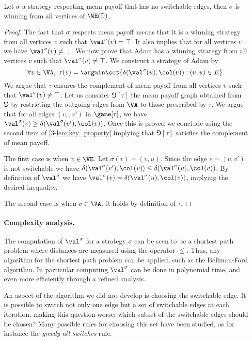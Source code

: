 \begin{lemma}[Optimality]
Let $\sigma$ a strategy respecting mean payoff that has no switchable edges, then 
$\sigma$ is winning from all vertices of $\WE(\Game)$.
\end{lemma}

\begin{proof}
The fact that $\sigma$ respects mean payoff means that it is a winning strategy
from all vertices $v$ such that $\val^\sigma(v) = \top$.
It also implies that for all vertices $v$ we have $\val^{\sigma}(v) \neq \bot$.
We now prove that Adam has a winning strategy from all vertices $v$ such that $\val^{\sigma}(v) \neq \top$.
We construct a strategy of Adam by
\[
\forall v \in \VA,\ \tau(v) = \argmin \set{ \delta(\val^{\sigma}(u),\col(v)) : (v,u) \in E }.
\]
We argue that $\tau$ ensures the complement of mean payoff from all vertices $v$ such that $\val^{\sigma}(v) \neq \top$.
Let us consider $\Game[\tau]$ the mean payoff graph obtained from $\Game$ by restricting the outgoing edges from $\VA$
to those prescribed by $\tau$.
We argue that for all edges $(v,,v')$ in $\game[\tau]$, we have 
$\val^{\sigma}(v) \ge \delta(\val^{\sigma}(v'),\col(v))$.
Once this is proved we conclude using the second item of \cref{3-lem:key_property} implying that $\Game[\tau]$ satisfies the complement of mean payoff.

The first case is when $v \in \VE$. 
Let $\sigma(v) = (v,u)$.
Since the edge $e = (v,v')$ is not switchable we have 
$\delta(\val^{\sigma}(v'),\col(v)) \le \delta(\val^{\sigma}(u),\col(v))$.
By definition of $\val^\sigma$ we have $\val^\sigma(v) = \delta(\val^{\sigma}(u),\col(v))$,
implying the desired inequality.

The second case is when $v \in \VA$, it holds by definition of $\tau$.
\end{proof}

\paragraph{\bf Complexity analysis.}
The computation of $\val^\sigma$ for a strategy $\sigma$ can be seen to be a shortest path problem where distances are measured using the operator $\le$. 
Thus, any algorithm for the shortest path problem can be applied, such as the Bellman-Ford algorithm.
In particular computing $\val^\sigma$ can be done in polynomial time, and even more efficiently through a refined analysis.

An aspect of the algorithm we did not develop is choosing the switchable edge.
It is possible to switch not only one edge but a set of switchable edges at each iteration, making this question worse: 
which subset of the switchable edges should be chosen?
Many possible rules for choosing this set have been studied, as for instance the \emph{greedy all-switches} rule. 


